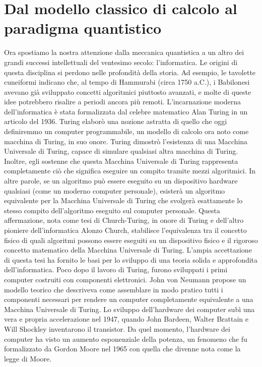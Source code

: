 \documentclass[a4paper,12pt]{report}
\theoremstyle{plain}
\begin{document}
\section{Dal modello classico di calcolo al paradigma quantistico}
Ora spostiamo la nostra attenzione dalla meccanica quantistica a un altro dei grandi successi intellettuali del ventesimo secolo: l'informatica. 
Le origini di questa disciplina si perdono nelle profondità della storia. Ad esempio, le tavolette cuneiformi indicano che, al tempo di Hammurabi (circa 1750 a.C.), i Babilonesi avevano già sviluppato concetti algoritmici piuttosto avanzati, e molte di queste idee potrebbero risalire a periodi ancora più remoti. 
L'incarnazione moderna dell'informatica è stata formalizzata dal celebre matematico Alan Turing in un articolo del 1936. Turing elaborò una nozione astratta di quello che oggi definiremmo un computer programmabile, un modello di calcolo ora noto come macchina di Turing, in suo onore. 
Turing dimostrò l'esistenza di una Macchina Universale di Turing, capace di simulare qualsiasi altra macchina di Turing. Inoltre, egli sostenne che questa Macchina Universale di Turing rappresenta completamente ciò che significa eseguire un compito tramite mezzi algoritmici. In altre parole, se un algoritmo può essere eseguito su un dispositivo hardware qualsiasi (come un moderno computer personale), esisterà un algoritmo equivalente per la Macchina Universale di Turing che svolgerà esattamente lo stesso compito dell'algoritmo eseguito sul computer personale. 
Questa affermazione, nota come tesi di Church-Turing, in onore di Turing e dell'altro pioniere dell'informatica Alonzo Church, stabilisce l'equivalenza tra il concetto fisico di quali algoritmi possono essere eseguiti su un dispositivo fisico e il rigoroso concetto matematico della Macchina Universale di Turing. 
L'ampia accettazione di questa tesi ha fornito le basi per lo sviluppo di una teoria solida e approfondita dell'informatica. 
Poco dopo il lavoro di Turing, furono sviluppati i primi computer costruiti con componenti elettronici. John von Neumann propose un modello teorico che descriveva come assemblare in modo pratico tutti i componenti necessari per rendere un computer completamente equivalente a una Macchina Universale di Turing. 
Lo sviluppo dell'hardware dei computer subì una vera e propria accelerazione nel 1947, quando John Bardeen, Walter Brattain e Will Shockley inventarono il transistor. Da quel momento, l'hardware dei computer ha visto un aumento esponenziale della potenza, un fenomeno che fu formalizzato da Gordon Moore nel 1965 con quella che divenne nota come la legge di Moore. 
\end{document}
